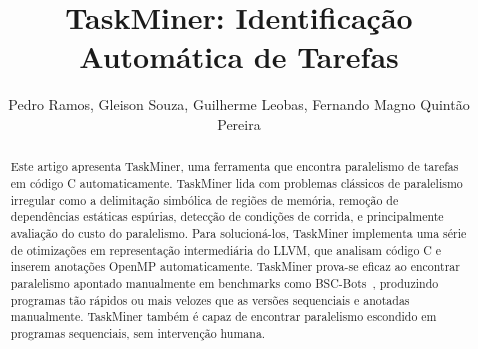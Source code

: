\documentclass[sigplan,10pt,review]{acmart}
\newcommand\Taskminer{\mbox{\textsf{TaskMiner}}}
\begin{document}
\title[TaskMiner: Identifica\c{c}\~{a}o Autom\'{a}tica de Tarefas]
{TaskMiner: Identificação Automática de Tarefas}



\author{Pedro Ramos, Gleison Souza, Guilherme Leobas, Fernando Magno Quint\~{a}o Pereira}




\begin{abstract}
Este artigo apresenta \Taskminer{}, uma ferramenta que encontra paralelismo de tarefas
em código C automaticamente. \Taskminer{} lida com problemas clássicos de paralelismo irregular 
como a delimitação simbólica de regiões de memória, remoção de dependências
estáticas espúrias, detecção de condições de corrida, e principalmente avaliação do custo do paralelismo. Para solucioná-los,
\Taskminer{} implementa uma série de otimizações em representa\-ção intermediária do LLVM, que analisam código C e inserem anotações OpenMP automaticamente. \Taskminer{} prova-se eficaz ao encontrar paralelismo apontado manualmente em benchmarks como \textsf{BSC-Bots}~\cite{Duran09}, produzindo programas tão rápidos ou mais velozes que as versões sequenciais e anotadas manualmente. \Taskminer{} também é capaz de encontrar paralelismo escondido em programas sequenciais, sem intervenção humana.
\end{abstract}
\end{document}
